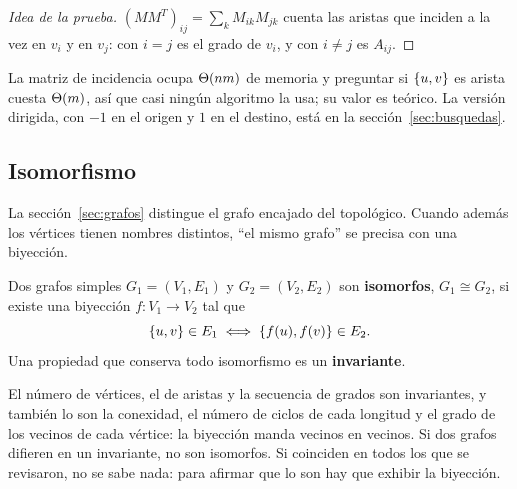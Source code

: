 \documentclass[11pt,letterpaper]{article}
\begin{document}
\begin{proof}[Idea de la prueba]
  $(M M^{T})_{ij} = \sum_{k} M_{ik} M_{jk}$ cuenta las aristas que
  inciden a la vez en $v_i$ y en $v_j$: con $i = j$ es el grado de
  $v_i$, y con $i \neq j$ es $A_{ij}$.
\end{proof}


La matriz de incidencia ocupa $\Theta\!\left(nm\right)$ de memoria y preguntar si
$\left\{ u, v \right\}$ es arista cuesta $\Theta\!\left(m\right)$, así que casi ningún algoritmo
la usa; su valor es teórico. La versión dirigida, con $-1$ en el
origen y $1$ en el destino, está en la sección~\ref{sec:busquedas}.


\subsection*{Isomorfismo}

La sección~\ref{sec:grafos} distingue el grafo encajado del
topológico. Cuando además los vértices tienen nombres distintos, ``el
mismo grafo'' se precisa con una biyección.

\begin{definicion}[Isomorfismo]
  \label{def:isomorfismo}
  Dos grafos simples $G_1 = (V_1, E_1)$ y $G_2 = (V_2, E_2)$ son
  \textbf{isomorfos}, $G_1 \cong G_2$, si existe una biyección
  $f : V_1 \to V_2$ tal que
  \[
    \left\{ u, v \right\} \in E_1 \iff \left\{ f(u), f(v) \right\} \in E_2 .
  \]
  Una propiedad que conserva todo isomorfismo es un
  \textbf{invariante}.
\end{definicion}

El número de vértices, el de aristas y la secuencia de grados son
invariantes, y también lo son la conexidad, el número de ciclos de
cada longitud y el grado de los vecinos de cada vértice: la biyección
manda vecinos en vecinos. Si dos grafos difieren en un invariante, no
son isomorfos. Si coinciden en todos los que se revisaron, no se sabe
nada: para afirmar que lo son hay que exhibir la biyección.
\end{document}
